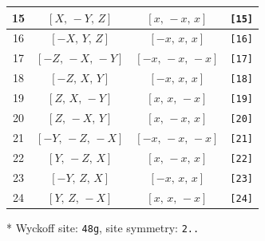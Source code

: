 \documentclass[fleqn,8pt]{jsarticle}
\begin{document}
\begin{longtable}{cccc}
15 & $\left[ X,\, - Y,\, Z \right]$ & $\left[ x,\, - x,\, x \right]$ & {\tt [15]} \\ \hline
16 & $\left[ - X,\, Y,\, Z \right]$ & $\left[ - x,\, x,\, x \right]$ & {\tt [16]} \\ \hline
17 & $\left[ - Z,\, - X,\, - Y \right]$ & $\left[ - x,\, - x,\, - x \right]$ & {\tt [17]} \\ \hline
18 & $\left[ - Z,\, X,\, Y \right]$ & $\left[ - x,\, x,\, x \right]$ & {\tt [18]} \\ \hline
19 & $\left[ Z,\, X,\, - Y \right]$ & $\left[ x,\, x,\, - x \right]$ & {\tt [19]} \\ \hline
20 & $\left[ Z,\, - X,\, Y \right]$ & $\left[ x,\, - x,\, x \right]$ & {\tt [20]} \\ \hline
21 & $\left[ - Y,\, - Z,\, - X \right]$ & $\left[ - x,\, - x,\, - x \right]$ & {\tt [21]} \\ \hline
22 & $\left[ Y,\, - Z,\, X \right]$ & $\left[ x,\, - x,\, x \right]$ & {\tt [22]} \\ \hline
23 & $\left[ - Y,\, Z,\, X \right]$ & $\left[ - x,\, x,\, x \right]$ & {\tt [23]} \\ \hline
24 & $\left[ Y,\, Z,\, - X \right]$ & $\left[ x,\, x,\, - x \right]$ & {\tt [24]} \\
\end{longtable}
* Wyckoff site: {\tt 48g}, site symmetry: {\tt 2..}
\renewcommand{\arraystretch}{1.2}
\end{document}
